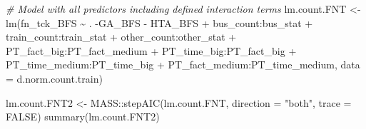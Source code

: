 \documentclass[
]{article}
\newenvironment{Shaded}{\begin{snugshade}}{\end{snugshade}}
\newcommand{\AttributeTok}[1]{\textcolor[rgb]{0.77,0.63,0.00}{#1}}
\newcommand{\CommentTok}[1]{\textcolor[rgb]{0.56,0.35,0.01}{\textit{#1}}}
\newcommand{\ConstantTok}[1]{\textcolor[rgb]{0.00,0.00,0.00}{#1}}
\newcommand{\FunctionTok}[1]{\textcolor[rgb]{0.00,0.00,0.00}{#1}}
\newcommand{\NormalTok}[1]{#1}
\newcommand{\OtherTok}[1]{\textcolor[rgb]{0.56,0.35,0.01}{#1}}
\newcommand{\SpecialCharTok}[1]{\textcolor[rgb]{0.00,0.00,0.00}{#1}}
\newcommand{\StringTok}[1]{\textcolor[rgb]{0.31,0.60,0.02}{#1}}
\begin{document}
\begin{Shaded}
\begin{Highlighting}[]
\CommentTok{\# Model with all predictors including defined interaction terms}
\NormalTok{lm.count.FNT }\OtherTok{\textless{}{-}} \FunctionTok{lm}\NormalTok{(fn\_tck\_BFS }\SpecialCharTok{\textasciitilde{}}\NormalTok{ . }\SpecialCharTok{{-}}\NormalTok{GA\_BFS }\SpecialCharTok{{-}}\NormalTok{ HTA\_BFS }
                    \SpecialCharTok{+}\NormalTok{ bus\_count}\SpecialCharTok{:}\NormalTok{bus\_stat}
                    \SpecialCharTok{+}\NormalTok{ train\_count}\SpecialCharTok{:}\NormalTok{train\_stat}
                    \SpecialCharTok{+}\NormalTok{ other\_count}\SpecialCharTok{:}\NormalTok{other\_stat}
                    \SpecialCharTok{+}\NormalTok{ PT\_fact\_big}\SpecialCharTok{:}\NormalTok{PT\_fact\_medium}
                    \SpecialCharTok{+}\NormalTok{ PT\_time\_big}\SpecialCharTok{:}\NormalTok{PT\_fact\_big}
                    \SpecialCharTok{+}\NormalTok{ PT\_time\_medium}\SpecialCharTok{:}\NormalTok{PT\_time\_big}
                    \SpecialCharTok{+}\NormalTok{ PT\_fact\_medium}\SpecialCharTok{:}\NormalTok{PT\_time\_medium, }
                  \AttributeTok{data =}\NormalTok{ d.norm.count.train) }

\NormalTok{lm.count.FNT2 }\OtherTok{\textless{}{-}}\NormalTok{ MASS}\SpecialCharTok{::}\FunctionTok{stepAIC}\NormalTok{(lm.count.FNT, }\AttributeTok{direction =} \StringTok{"both"}\NormalTok{, }\AttributeTok{trace =} \ConstantTok{FALSE}\NormalTok{)}
\FunctionTok{summary}\NormalTok{(lm.count.FNT2)}
\end{Highlighting}
\end{Shaded}
\end{document}
